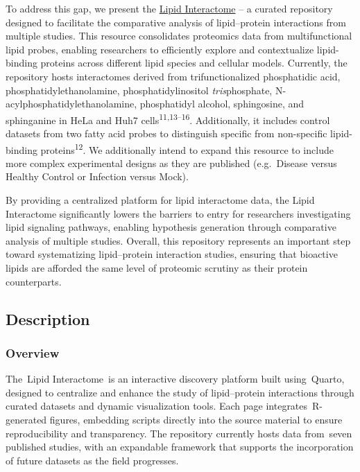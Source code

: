 \documentclass[
  letterpaper,
  DIV=11,
  numbers=noendperiod]{scrartcl}
\begin{document}
To address this gap, we present the
\href{https://www.lipidinteractome.org}{Lipid Interactome} -- a curated
repository designed to facilitate the comparative analysis of
lipid--protein interactions from multiple studies. This resource
consolidates proteomics data from multifunctional lipid probes, enabling
researchers to efficiently explore and contextualize lipid-binding
proteins across different lipid species and cellular models. Currently,
the repository hosts interactomes derived from trifunctionalized
phosphatidic acid, phosphatidylethanolamine, phosphatidylinositol
\emph{tris}phosphate, N-acylphosphatidylethanolamine, phosphatidyl
alcohol, sphingosine, and sphinganine in HeLa and Huh7
cells\textsuperscript{11,13--16}. Additionally, it includes control
datasets from two fatty acid probes to distinguish specific from
non-specific lipid-binding proteins\textsuperscript{12}. We additionally
intend to expand this resource to include more complex experimental
designs as they are published (e.g.~Disease versus Healthy Control or
Infection versus Mock).

By providing a centralized platform for lipid interactome data, the
Lipid Interactome significantly lowers the barriers to entry for
researchers investigating lipid signaling pathways, enabling hypothesis
generation through comparative analysis of multiple studies. Overall,
this repository represents an important step toward systematizing
lipid--protein interaction studies, ensuring that bioactive lipids are
afforded the same level of proteomic scrutiny as their protein
counterparts.

\subsection{Description}\label{description}

\subsubsection{Overview}\label{overview}

The~Lipid Interactome~is an interactive discovery platform built
using~Quarto, designed to centralize and enhance the study of
lipid--protein interactions through curated datasets and dynamic
visualization tools. Each page integrates~R-generated figures, embedding
scripts directly into the source material to ensure reproducibility and
transparency. The repository currently hosts data from~seven published
studies, with an expandable framework that supports the incorporation of
future datasets as the field progresses.
\end{document}
